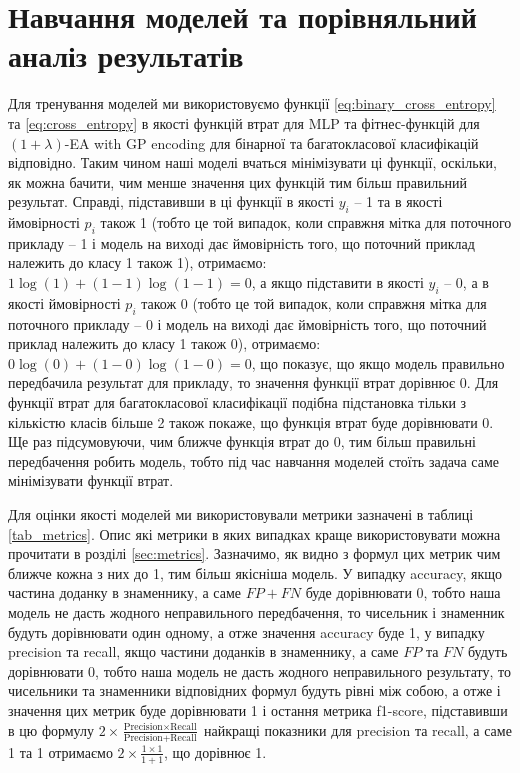 \section{Навчання моделей та порівняльний аналіз результатів}

Для тренування моделей ми використовуємо функції \ref{eq:binary_cross_entropy} та \ref{eq:cross_entropy} в якості функцій втрат для MLP та фітнес-функцій для $(1+\lambda)$-EA with GP encoding для бінарної та багатокласової класифікацій відповідно. Таким чином наші моделі вчаться мінімізувати ці функції, оскільки, як можна бачити, чим менше значення цих функцій тим більш правильний результат. Справді, підставивши в ці функції в якості $y_i$ -- 1 та в якості ймовірності $p_i$ також 1 (тобто це той випадок, коли справжня мітка для поточного прикладу -- 1 і модель на виході дає ймовірність того, що поточний приклад належить до класу 1 також 1), отримаємо: $1 \log(1) + (1 - 1) \log(1 - 1) = 0$, а якщо підставити в якості $y_i$ -- 0, а в якості ймовірності $p_i$ також 0 (тобто це той випадок, коли справжня мітка для поточного прикладу -- 0 і модель на виході дає ймовірність того, що поточний приклад належить до класу 1 також 0), отримаємо: $0 \log(0) + (1 - 0) \log(1 - 0) = 0$, що показує, що якщо модель правильно передбачила результат для прикладу, то значення функції втрат дорівнює 0. Для функції втрат для багатокласової класифікації подібна підстановка тільки з кількістю класів більше 2 також покаже, що функція втрат буде дорівнювати 0. Ще раз підсумовуючи, чим ближче функція втрат до 0, тим більш правильні передбачення робить модель, тобто під час навчання моделей стоїть задача саме мінімізувати функції втрат.

Для оцінки якості моделей ми використовували метрики зазначені в таблиці \ref{tab_metrics}. Опис які метрики в яких випадках краще використовувати можна прочитати в розділі \ref{sec:metrics}. Зазначимо, як видно з формул цих метрик чим ближче кожна з них до 1, тим більш якісніша модель. У випадку accuracy, якщо частина доданку в знаменнику, а саме $FP+FN$ буде дорівнювати 0, тобто наша модель не дасть жодного неправильного передбачення, то чисельник і знаменник будуть дорівнювати один одному, а отже значення accuracy буде 1, у випадку precision та recall, якщо частини доданків в знаменнику, а саме $FP$ та $FN$ будуть дорівнювати 0, тобто наша модель не дасть жодного неправильного результату, то чисельники та знаменники відповідних формул будуть рівні між собою, а отже і значення цих метрик буде дорівнювати 1 і остання метрика f1-score, підставивши в цю формулу $2 \times \frac{\text{Precision} \times \text{Recall}}{\text{Precision} + \text{Recall}}$ найкращі показники для precision та recall, а саме 1 та 1 отримаємо $2 \times \frac{1 \times 1}{1 + 1}$, що дорівнює 1.

